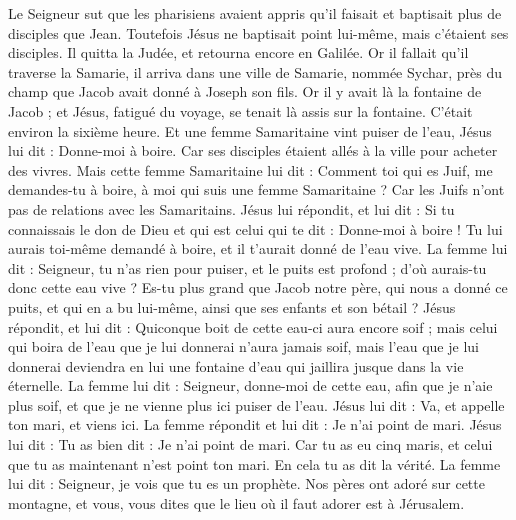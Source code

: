\begin{multicols}{2}
\VerseOne{}Le Seigneur sut que les pharisiens avaient appris qu'il faisait et baptisait plus de disciples que Jean.
Toutefois Jésus ne baptisait point lui-même, mais c'étaient ses disciples.
Il quitta la Judée, et retourna encore en Galilée.
Or il fallait qu'il traverse la Samarie,
il arriva dans une ville de Samarie, nommée Sychar, près du champ que Jacob avait donné à Joseph son fils.
Or il y avait là la fontaine de Jacob ; et Jésus, fatigué du voyage, se tenait là assis sur la fontaine. C'était environ la sixième heure.
Et une femme Samaritaine vint puiser de l'eau, Jésus lui dit : Donne-moi à boire.
Car ses disciples étaient allés à la ville pour acheter des vivres.
Mais cette femme Samaritaine lui dit : Comment toi qui es Juif, me demandes-tu à boire, à moi qui suis une femme Samaritaine ? Car les Juifs n'ont pas de relations avec les Samaritains.
Jésus lui répondit, et lui dit : Si tu connaissais le don de Dieu et qui est celui qui te dit : Donne-moi à boire ! Tu lui aurais toi-même demandé à boire, et il t'aurait donné de l'eau vive.
La femme lui dit : Seigneur, tu n'as rien pour puiser, et le puits est profond ; d'où aurais-tu donc cette eau vive ?
Es-tu plus grand que Jacob notre père, qui nous a donné ce puits, et qui en a bu lui-même, ainsi que ses enfants et son bétail ?
Jésus répondit, et lui dit : Quiconque boit de cette eau-ci aura encore soif ;
mais celui qui boira de l'eau que je lui donnerai n'aura jamais soif, mais l'eau que je lui donnerai deviendra en lui une fontaine d'eau qui jaillira jusque dans la vie éternelle.
La femme lui dit : Seigneur, donne-moi de cette eau, afin que je n'aie plus soif, et que je ne vienne plus ici puiser de l'eau.
Jésus lui dit : Va, et appelle ton mari, et viens ici.
La femme répondit et lui dit : Je n'ai point de mari. Jésus lui dit : Tu as bien dit : Je n'ai point de mari.
Car tu as eu cinq maris, et celui que tu as maintenant n'est point ton mari. En cela tu as dit la vérité.
La femme lui dit : Seigneur, je vois que tu es un prophète.
Nos pères ont adoré sur cette montagne, et vous, vous dites que le lieu où il faut adorer est à Jérusalem.

\end{multicols}
